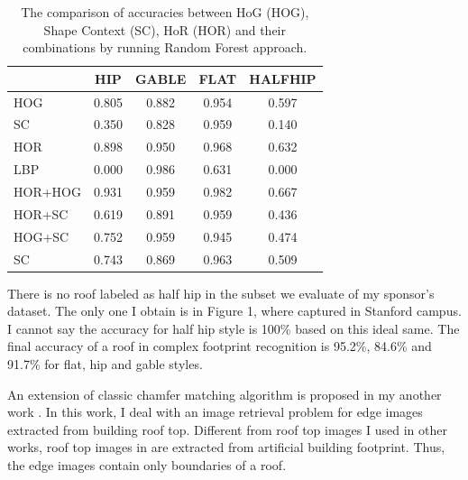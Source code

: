 \documentclass{iitthesis}
\begin{document}
\begin{table}[t]
\caption{The comparison of accuracies between HoG (HOG), Shape Context (SC), HoR (HOR) and their combinations by running Random Forest  approach.}
    \centering
    \scalebox{1.0}
    {
        \begin{tabular}{lcccc}
            \hline \hline
            
            &HIP & GABLE & FLAT & HALFHIP\\
            \hline
            
            HOG & 0.805 & 0.882 & 0.954 & 0.597 \\
            
            SC & 0.350 & 0.828 & 0.959 & 0.140 \\
            
            HOR & 0.898 & 0.950 & 0.968 & 0.632 \\
            
            LBP & 0.000 & 0.986 & 0.631 & 0.000 \\
            
            HOR+HOG & 0.931 & 0.959 & 0.982 & 0.667 \\
            
            HOR+SC & 0.619 & 0.891 & 0.959 & 0.436 \\
            
            HOG+SC & 0.752 & 0.959 & 0.945 & 0.474 \\
            
            SC & 0.743 & 0.869 & 0.963 & 0.509 \\
            \hline
        \end{tabular}
    }
    \label{table: ac}
\end{table}

There is no roof labeled as half hip in the subset we evaluate of my sponsor's dataset. The only one I obtain is in Figure 1, where captured in Stanford campus. I cannot say the accuracy for half hip style is 100\% based on this ideal same. The final accuracy of a roof in complex footprint recognition is 95.2\%, 84.6\% and 91.7\% for flat, hip and gable styles.

 An extension of classic chamfer matching algorithm is proposed in my another work \cite{ZX14}. In this work, I deal with an image retrieval problem for edge images extracted from building roof top. Different from roof top images I used in other works, roof top images in \cite{ZX14} are extracted from artificial building footprint. Thus, the edge images contain only boundaries of a roof. 
\end{document}
